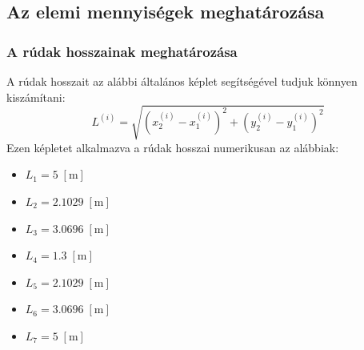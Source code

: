 \documentclass[12pt,a4paper]{article}
\def\m{\; \left[\mathrm{m}\right]}
\begin{document}
\subsection{Az elemi mennyiségek meghatározása}
\subsubsection{A rúdak hosszainak meghatározása}
A rúdak hosszait az alábbi általános képlet segítségével tudjuk
könnyen kiszámítani:
\begin{equation}
    \boxed{L^{\left(i\right)}=\sqrt{\left(x^{\left(i\right)}_2-x^{\left(i\right)}_1\right)^2+
            \left(y^{\left(i\right)}_2-y^{\left(i\right)}_1\right)^2}}
\end{equation}
Ezen képletet alkalmazva a rúdak hosszai numerikusan az alábbiak:
\begin{multicols}{4}
    \begin{itemize}
        \item $L_1=5 \m$
        \item $L_2=2.1029 \m$
    \end{itemize}
    \columnbreak
    \begin{itemize}
        \item $L_3=3.0696 \m$
        \item $L_4=1.3 \m$
    \end{itemize}
    \columnbreak
    \begin{itemize}
        \item $L_5=2.1029 \m$
        \item $L_6=3.0696 \m$
    \end{itemize}
    \columnbreak
    \begin{itemize}
        \item $L_7=5 \m$
    \end{itemize}
\end{multicols}
\end{document}
